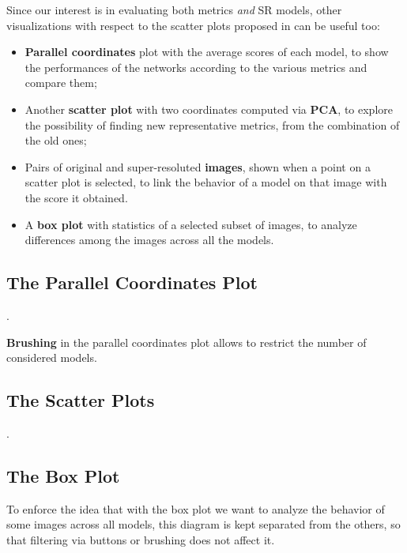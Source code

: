 \documentclass[12pt]{article}
\begin{document}
	Since our interest is in evaluating both metrics \textit{and} SR models, other visualizations with respect to the scatter plots proposed in \cite{galasso2013unified} can be useful too:
	\begin{itemize}
		\item \textbf{Parallel coordinates} plot with the average scores of each model, to show the performances of the networks according to the various metrics and compare them;
		\item Another \textbf{scatter plot} with two coordinates computed via \textbf{PCA}, to explore the possibility of finding new representative metrics, from the combination of the old ones;
		\item Pairs of original and super-resoluted \textbf{images}, shown when a point on a scatter plot is selected, to link the behavior of a model on that image with the score it obtained.
		\item A \textbf{box plot} with statistics of a selected subset of images, to analyze differences among the images across all the models.
	\end{itemize}

	\subsection{The Parallel Coordinates Plot}

	.

	\textbf{Brushing} in the parallel coordinates plot allows to restrict the number of considered models.

	\subsection{The Scatter Plots}

	.

	\subsection{The Box Plot}

	To enforce the idea that with the box plot we want to analyze the behavior of some images across all models, this diagram is kept separated from the others, so that filtering via buttons or brushing does not affect it.

	\newpage
	\printbibliography
\end{document}
